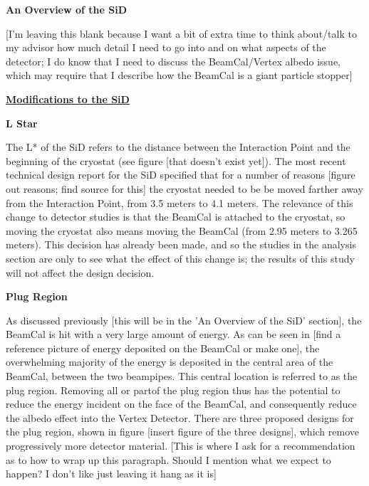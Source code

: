 \documentclass{article}
\begin{document}
        \vspace{5mm}
        \begin{center} \bf{An Overview of the SiD} \end{center}

        [I'm leaving this blank because I want a bit of extra time to think about/talk to my advisor how much detail I need to go into and on what aspects of the detector; I do know that I need to discuss the BeamCal/Vertex albedo issue, which may require that I describe how the BeamCal is a giant particle stopper]



    \vspace{10mm}
    \begin{center}
        \underline{\bf{\large Modifications to the SiD}}
    \end{center}
        \begin{center}
            \bf{L Star}
        \end{center}

        The L* of the SiD refers to the distance between the Interaction Point and the beginning of the cryostat (see figure [that doesn't exist yet]). The most recent technical design report for the SiD specified that for a number of reasons [figure out reasons; find source for this] the cryostat needed to be be moved farther away from the Interaction Point, from 3.5 meters to 4.1 meters. The relevance of this change to detector studies is that the BeamCal is attached to the cryostat, so moving the cryostat also means moving the BeamCal (from 2.95 meters to 3.265 meters). This decision has already been made, and so the studies in the analysis section are only to see what the effect of this change is; the results of this study will not affect the design decision.


        \begin{center}
            \bf{Plug Region}
        \end{center}

        As discussed previously [this will be in the 'An Overview of the SiD' section], the BeamCal is hit with a very large amount of energy. As can be seen in [find a reference picture of energy deposited on the BeamCal or make one], the overwhelming majority of the energy is deposited in the central area of the BeamCal, between the two beampipes. This central location is referred to as the plug region. Removing all or partof the plug region thus has the potential to reduce the energy incident on the face of the BeamCal, and consequently reduce the albedo effect into the Vertex Detector. There are three proposed designs for the plug region, shown in figure [insert figure of the three designs], which remove progressively more detector material. [This is where I ask for a recommendation as to how to wrap up this paragraph. Should I mention what we expect to happen? I don't like just leaving it hang as it is]
\end{document}
